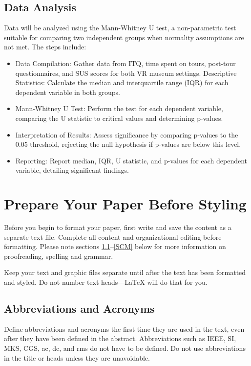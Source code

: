 \documentclass[conference]{IEEEtran}
\begin{document}
\subsection{Data Analysis}
Data will be analyzed using the Mann-Whitney U test, a non-parametric test suitable for comparing two independent groups when normality assumptions are not met. The steps include:
\begin{itemize}
\item Data Compilation: Gather data from ITQ, time spent on tours, post-tour questionnaires, and SUS scores for both VR museum settings.
Descriptive Statistics: Calculate the median and interquartile range (IQR) for each dependent variable in both groups.
\item Mann-Whitney U Test: Perform the test for each dependent variable, comparing the U statistic to critical values and determining p-values.
\item Interpretation of Results: Assess significance by comparing p-values to the 0.05 threshold, rejecting the null hypothesis if p-values are below this level.
\item Reporting: Report median, IQR, U statistic, and p-values for each dependent variable, detailing significant findings.
\end{itemize}

\section{Prepare Your Paper Before Styling}
Before you begin to format your paper, first write and save the content as a 
separate text file. Complete all content and organizational editing before 
formatting. Please note sections \ref{AA}--\ref{SCM} below for more information on 
proofreading, spelling and grammar.

Keep your text and graphic files separate until after the text has been 
formatted and styled. Do not number text heads---{\LaTeX} will do that 
for you.

\subsection{Abbreviations and Acronyms}\label{AA}
Define abbreviations and acronyms the first time they are used in the text, 
even after they have been defined in the abstract. Abbreviations such as 
IEEE, SI, MKS, CGS, ac, dc, and rms do not have to be defined. Do not use 
abbreviations in the title or heads unless they are unavoidable.
\end{document}
